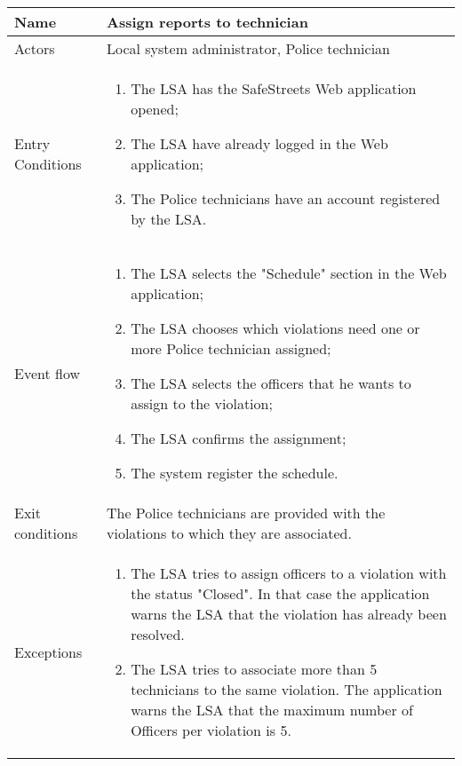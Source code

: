 \begin{table}[H]
  \centering
  \begin{tabularx}{\textwidth}{ |l|X| }
    \hline
    Name & Assign reports to technician \\
    \hline
    Actors & Local system administrator, Police technician\\
    \hline
    Entry Conditions & \begin{enumerate}[noitemsep]
                        \item The LSA has the SafeStreets Web application opened;
                        \item The LSA have already logged in the Web application;
                        \item The Police technicians have an account registered by the LSA.
                      \end{enumerate}\\
    \hline
    Event flow & \begin{enumerate}[noitemsep]
                    \item The LSA selects the "Schedule" section in the Web application;
                    \item The LSA chooses which violations need one or more Police technician assigned;
                    \item The LSA selects the officers that he wants to assign to the violation;
                    \item The LSA confirms the assignment;
                    \item The system register the schedule.           
                \end{enumerate}\\
    \hline
    Exit conditions & The Police technicians are provided with the violations to which they are associated.\\ 
    \hline
    Exceptions &  \begin{enumerate}[noitemsep]
                    \item The LSA tries to assign officers to a violation with the status "Closed". In that case the application warns the LSA that the violation has already been resolved.
                    \item The LSA tries to associate more than 5 technicians to the same violation. The application warns the LSA that the maximum number of Officers per violation is 5. 
                  \end{enumerate}\\
    \hline
  \end{tabularx}
\end{table}

